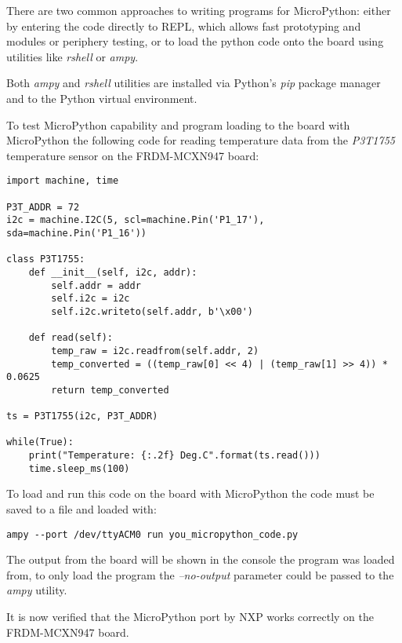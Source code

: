\documentclass[twoside, 12pt]{article}
\begin{document}
There are two common approaches to writing programs for MicroPython: either by entering the 
code directly to REPL, which allows fast prototyping and modules or periphery testing, or to 
load the python code onto the board using utilities like \textit{rshell} or \textit{ampy}. 

Both \textit{ampy} and \textit{rshell} utilities are installed via Python's \textit{pip} 
package manager and to the Python virtual environment.

To test MicroPython capability and program loading to the board with MicroPython the 
following code for reading temperature data from the \textit{P3T1755} temperature sensor on 
the FRDM-MCXN947 board:
\begin{lstlisting}[caption=Read tempreture data from P3T1755 sensor using MicroPython, breaklines=true]
import machine, time

P3T_ADDR = 72
i2c = machine.I2C(5, scl=machine.Pin('P1_17'), sda=machine.Pin('P1_16'))

class P3T1755:
    def __init__(self, i2c, addr):
        self.addr = addr
        self.i2c = i2c
        self.i2c.writeto(self.addr, b'\x00')

    def read(self):
        temp_raw = i2c.readfrom(self.addr, 2)
        temp_converted = ((temp_raw[0] << 4) | (temp_raw[1] >> 4)) * 0.0625
        return temp_converted

ts = P3T1755(i2c, P3T_ADDR)

while(True):
    print("Temperature: {:.2f} Deg.C".format(ts.read()))
    time.sleep_ms(100)
\end{lstlisting}

To load and run this code on the board with MicroPython the code must be saved to a file and 
loaded with:
\begin{lstlisting}[caption=Loading a program to FRDM-MCXN947 board with MicroPython using ampy utility, breaklines=true]
ampy --port /dev/ttyACM0 run you_micropython_code.py
\end{lstlisting}

The output from the board will be shown in the console the program was loaded from, to only 
load the program the \textit{--no-output} parameter could be passed to the \textit{ampy} 
utility.

\obrazek
{}

It is now verified that the MicroPython port by NXP works correctly on the FRDM-MCXN947 board.
\end{document}
